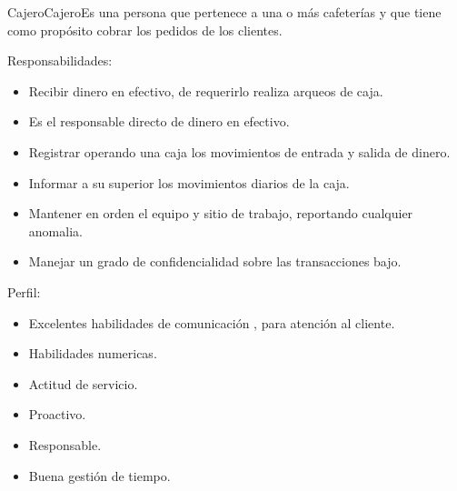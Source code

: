 	
	\begin{Actor}{Cajero}{Cajero}{Es una persona que pertenece a una o más cafeterías y que tiene como propósito cobrar los pedidos de los clientes.}
	
	\item[Responsabilidades:] \hspace{0.5cm}
		\begin{itemize}
			\item Recibir dinero en efectivo, de requerirlo realiza arqueos de caja.
			
			\item Es el responsable directo de dinero en efectivo.
			
			\item Registrar operando una caja los movimientos de entrada y salida de dinero.
			
			\item Informar a su superior los movimientos diarios de la caja.
			
			\item Mantener en orden el equipo y sitio de trabajo, reportando cualquier anomalia.
			
			\item Manejar un grado de confidencialidad sobre las transacciones bajo.
		\end{itemize}
	
	\item[Perfil:] \hspace{0.5cm}
		\begin{itemize}
			\item Excelentes habilidades de comunicación , para atención al cliente.
			
			\item Habilidades numericas.
			
			\item Actitud de servicio.
			
			\item Proactivo.
			
			\item Responsable.
			
			\item Buena gestión de tiempo.
		\end{itemize}
	
	\end{Actor}

